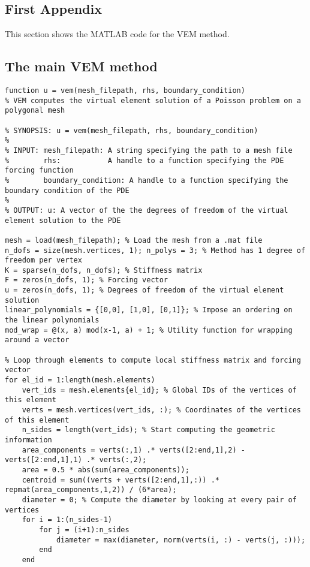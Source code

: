 \begin{appendices}

\setcounter{section}{0}                 %
\renewcommand{\thesection}{\Alph{section}} %
\renewcommand{\thesubsection}{\Alph{section}\arabic{subsection}} %
\renewcommand{\thesubsubsection}{\Alph{section}\arabic{subsection}.\arabic{subsubsection}} %

\section{First Appendix}
This section shows the MATLAB code for the VEM method.

\subsection{The main VEM method}

\begin{lstlisting}[style=MatlabStyle]
function u = vem(mesh_filepath, rhs, boundary_condition)
% VEM computes the virtual element solution of a Poisson problem on a polygonal mesh

% SYNOPSIS: u = vem(mesh_filepath, rhs, boundary_condition)
%
% INPUT: mesh_filepath: A string specifying the path to a mesh file
%        rhs:           A handle to a function specifying the PDE forcing function
%        boundary_condition: A handle to a function specifying the boundary condition of the PDE
% 
% OUTPUT: u: A vector of the the degrees of freedom of the virtual element solution to the PDE

mesh = load(mesh_filepath); % Load the mesh from a .mat file
n_dofs = size(mesh.vertices, 1); n_polys = 3; % Method has 1 degree of freedom per vertex
K = sparse(n_dofs, n_dofs); % Stiffness matrix
F = zeros(n_dofs, 1); % Forcing vector
u = zeros(n_dofs, 1); % Degrees of freedom of the virtual element solution
linear_polynomials = {[0,0], [1,0], [0,1]}; % Impose an ordering on the linear polynomials
mod_wrap = @(x, a) mod(x-1, a) + 1; % Utility function for wrapping around a vector

% Loop through elements to compute local stiffness matrix and forcing vector
for el_id = 1:length(mesh.elements)
    vert_ids = mesh.elements{el_id}; % Global IDs of the vertices of this element
    verts = mesh.vertices(vert_ids, :); % Coordinates of the vertices of this element
    n_sides = length(vert_ids); % Start computing the geometric information
    area_components = verts(:,1) .* verts([2:end,1],2) - verts([2:end,1],1) .* verts(:,2);
    area = 0.5 * abs(sum(area_components));
    centroid = sum((verts + verts([2:end,1],:)) .* repmat(area_components,1,2)) / (6*area);
    diameter = 0; % Compute the diameter by looking at every pair of vertices
    for i = 1:(n_sides-1)
        for j = (i+1):n_sides
            diameter = max(diameter, norm(verts(i, :) - verts(j, :)));
        end
    end


\end{lstlisting}
\end{appendices}

